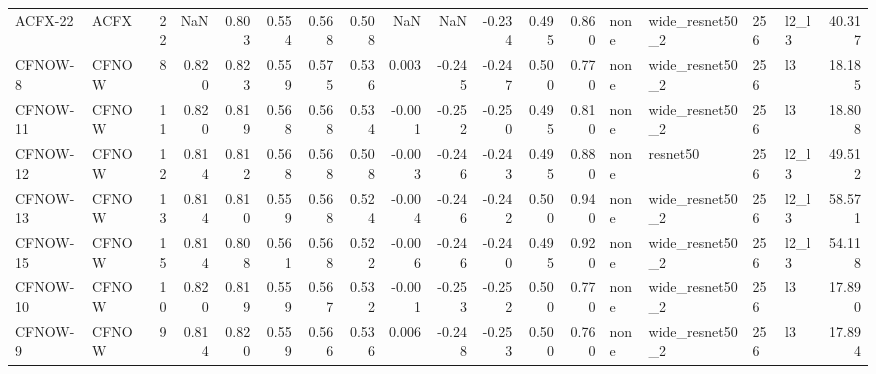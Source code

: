 \begin{tabular}{llrrrrrrrrrrrllllr}
  ACFX-22 &   ACFX &     22 &              NaN &         0.803 &        0.554 &                   0.568 &       0.508 &                 NaN &            NaN &            -0.234 &          0.495 &              0.860 &       none & wide\_resnet50\_2 &        256 &  l2\_l3 &       40.317 \\
  CFNOW-8 &  CFNOW &      8 &            0.820 &         0.823 &        0.559 &                   0.575 &       0.536 &               0.003 &         -0.245 &            -0.247 &          0.500 &              0.770 &       none & wide\_resnet50\_2 &        256 &     l3 &       18.185 \\
 CFNOW-11 &  CFNOW &     11 &            0.820 &         0.819 &        0.568 &                   0.568 &       0.534 &              -0.001 &         -0.252 &            -0.250 &          0.495 &              0.810 &       none & wide\_resnet50\_2 &        256 &     l3 &       18.808 \\
 CFNOW-12 &  CFNOW &     12 &            0.814 &         0.812 &        0.568 &                   0.568 &       0.508 &              -0.003 &         -0.246 &            -0.243 &          0.495 &              0.880 &       none &        resnet50 &        256 &  l2\_l3 &       49.512 \\
 CFNOW-13 &  CFNOW &     13 &            0.814 &         0.810 &        0.559 &                   0.568 &       0.524 &              -0.004 &         -0.246 &            -0.242 &          0.500 &              0.940 &       none & wide\_resnet50\_2 &        256 &  l2\_l3 &       58.571 \\
 CFNOW-15 &  CFNOW &     15 &            0.814 &         0.808 &        0.561 &                   0.568 &       0.522 &              -0.006 &         -0.246 &            -0.240 &          0.495 &              0.920 &       none & wide\_resnet50\_2 &        256 &  l2\_l3 &       54.118 \\
 CFNOW-10 &  CFNOW &     10 &            0.820 &         0.819 &        0.559 &                   0.567 &       0.532 &              -0.001 &         -0.253 &            -0.252 &          0.500 &              0.770 &       none & wide\_resnet50\_2 &        256 &     l3 &       17.890 \\
  CFNOW-9 &  CFNOW &      9 &            0.814 &         0.820 &        0.559 &                   0.566 &       0.536 &               0.006 &         -0.248 &            -0.253 &          0.500 &              0.760 &       none & wide\_resnet50\_2 &        256 &     l3 &       17.894 \\

\end{tabular}
